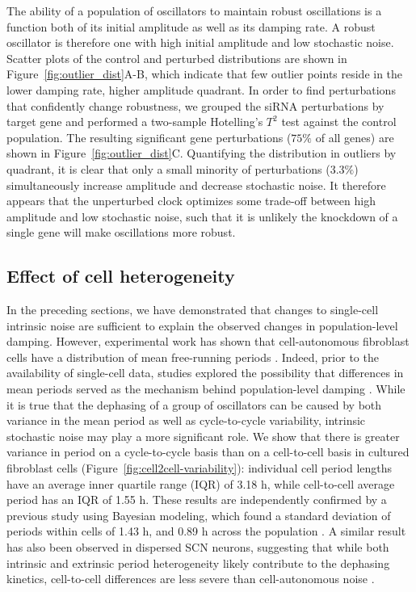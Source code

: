 \documentclass[11pt, letterpaper]{article}
\begin{document}
The ability of a population of oscillators to maintain robust oscillations is a function both of its initial amplitude as well as its damping rate.
A robust oscillator is therefore one with high initial amplitude and low stochastic noise.
Scatter plots of the control and perturbed distributions are shown in Figure~\ref{fig:outlier_dist}A-B, which indicate that few outlier points reside in the lower damping rate, higher amplitude quadrant.
In order to find perturbations that confidently change robustness, we grouped the siRNA perturbations by target gene and performed a two-sample Hotelling's $T^2$ test against the control population.
The resulting significant gene perturbations ($75\%$ of all genes) are shown in Figure~\ref{fig:outlier_dist}C.
Quantifying the distribution in outliers by quadrant, it is clear that only a small minority of perturbations ($3.3\%$) simultaneously increase amplitude and decrease stochastic noise.
It therefore appears that the unperturbed clock optimizes some trade-off between high amplitude and low stochastic noise, such that it is unlikely the knockdown of a single gene will make oscillations more robust. 

\subsection*{Effect of cell heterogeneity}

In the preceding sections, we have demonstrated that changes to single-cell intrinsic noise are sufficient to explain the observed changes in population-level damping.
However, experimental work has shown that cell-autonomous fibroblast cells have a distribution of mean free-running periods \cite{Leise2012}.
Indeed, prior to the availability of single-cell data, studies explored the possibility that differences in mean periods served as the mechanism behind population-level damping \cite{Izumo2003}.
While it is true that the dephasing of a group of oscillators can be caused by both variance in the mean period as well as cycle-to-cycle variability, intrinsic stochastic noise may play a more significant role. 
We show that there is greater variance in period on a cycle-to-cycle basis than on a cell-to-cell basis in cultured fibroblast cells (Figure~\ref{fig:cell2cell-variability}): individual cell period lengths have an average inner quartile range (IQR) of 3.18 h, while cell-to-cell average period has an IQR of 1.55 h. 
These results are independently confirmed by a previous study using Bayesian modeling, which found a standard deviation of periods within cells of 1.43 h, and 0.89 h across the population \cite{Cohen2012}.
A similar result has also been observed in dispersed SCN neurons, suggesting that while both intrinsic and extrinsic period heterogeneity likely contribute to the dephasing kinetics, cell-to-cell differences are less severe than cell-autonomous noise \cite{Herzog2004}.
\end{document}
